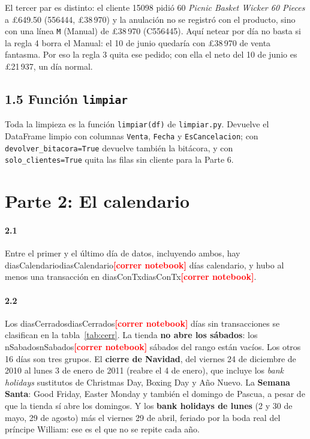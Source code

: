 \documentclass[11pt]{article}
\newcommand{\pendiente}{\textcolor{red}{\textbf{[correr notebook]}}}
\newcommand{\cf}[1]{\ifcsname #1\endcsname\csname #1\endcsname\else\pendiente\fi}
\begin{document}
El tercer par es distinto: el cliente 15098 pidió 60 \emph{Picnic Basket Wicker 60 Pieces} a £649.50 (556444,
£38\,970) y la anulación no se registró con el producto, sino con una línea \texttt{M} (Manual) de £38\,970
(C556445). Aquí netear por día no basta si la regla 4 borra el Manual: el 10 de junio quedaría con £38\,970 de
venta fantasma. Por eso la regla 3 quita ese pedido; con ella el neto del 10 de junio es £21\,937, un día normal.

\subsection*{1.5 Función \texttt{limpiar}}

Toda la limpieza es la función \texttt{limpiar(df)} de \texttt{limpiar.py}. Devuelve el DataFrame limpio con
columnas \texttt{Venta}, \texttt{Fecha} y \texttt{EsCancelacion}; con \texttt{devolver\_bitacora=True} devuelve
también la bitácora, y con \texttt{solo\_clientes=True} quita las filas sin cliente para la Parte 6.

\section{Parte 2: El calendario}

\paragraph{2.1} Entre el primer y el último día de datos, incluyendo ambos, hay \cf{diasCalendario} días calendario,
y hubo al menos una transacción en \cf{diasConTx}.

\paragraph{2.2} Los \cf{diasCerrados} días sin transacciones se clasifican en la tabla~\ref{tab:cerr}. La tienda
\textbf{no abre los sábados}: los \cf{nSabados} sábados del rango están vacíos. Los otros 16 días son tres grupos. El
\textbf{cierre de Navidad}, del viernes 24 de diciembre de 2010 al lunes 3 de enero de 2011 (reabre el 4 de enero),
que incluye los \emph{bank holidays} sustitutos de Christmas Day, Boxing Day y Año Nuevo. La \textbf{Semana Santa}:
Good Friday, Easter Monday y también el domingo de Pascua, a pesar de que la tienda sí abre los domingos. Y los
\textbf{bank holidays de lunes} (2 y 30 de mayo, 29 de agosto) más el viernes 29 de abril, feriado por la boda
real del príncipe William: ese es el que no se repite cada año.
\end{document}

